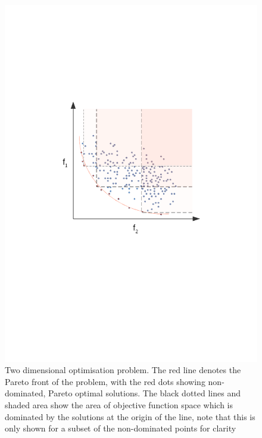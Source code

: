 \documentclass{article}
\begin{document}
			
			\begin{figure}[h]
			
				\centering 
				\includegraphics[trim= 250 380 250 190 ,scale=0.55]{pareto.png}


				\caption{Two dimensional optimisation problem. The red line denotes the Pareto front of the problem, with the red dots showing non-dominated, Pareto optimal solutions. The black dotted lines and shaded area show the area of objective function space which is dominated by the solutions at the origin of the line, note that this is only shown for a subset of the non-dominated points for clarity}
				\label{fig:GA3}


			\end{figure}
			~
			~
			~
\end{document}
